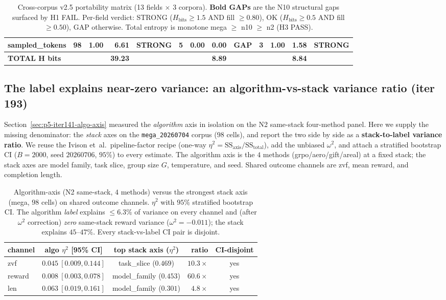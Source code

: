 \documentclass{article}  \usepackage[preprint,nonatbib]{neurips_2026} \usepackage[numbers]{natbib}
\begin{document}
\begin{table}[t]
\begin{tabular}{l r r r r r r r r r r r r}
sampled\_tokens       & 98 & 1.00 & 6.61 & STRONG & 5 & 0.00 & 0.00 & \textbf{GAP}    & 3 & 1.00 & 1.58 & STRONG \\
\midrule
\textbf{TOTAL H bits} & & & \textbf{39.23} & & & & \textbf{8.89} & & & & \textbf{8.84} & \\
\bottomrule
\end{tabular}
\caption{Cross-corpus v2.5 portability matrix (13 fields $\times$ 3 corpora).
\textbf{Bold GAPs} are the N10 structural gaps surfaced by H1 FAIL.
Per-field verdict: STRONG ($H_{\text{bits}} \geq 1.5$ AND fill $\geq 0.80$),
OK ($H_{\text{bits}} \geq 0.5$ AND fill $\geq 0.50$), GAP otherwise.
Total entropy is monotone mega $\geq$ n10 $\geq$ n2 (H3 PASS).}
\label{tab:p5-iter185-v25-cross-corpus}
\end{table} \subsection{The label explains near-zero variance: an algorithm-vs-stack
variance ratio (iter 193)}
\label{sec:p5-iter193-ratio}

Section~\ref{sec:p5-iter141-algo-axis} measured the \emph{algorithm} axis in
isolation on the N2 same-stack four-method panel. Here we supply the missing
denominator: the \emph{stack} axes on the \texttt{mega\_20260704} corpus
($98$ cells), and report the two side by side as a
\textbf{stack-to-label variance ratio}. We reuse the Ivison
et~al.\ pipeline-factor recipe (one-way $\eta^2 = \mathrm{SS}_{\text{axis}} /
\mathrm{SS}_{\text{total}}$), add the unbiased $\omega^2$, and attach a
stratified bootstrap CI ($B{=}2000$, seed $20260706$, $95\%$) to every estimate.
The algorithm axis is the $4$ methods (grpo/aero/gift/areal) at a fixed stack;
the stack axes are model family, task slice, group size $G$, temperature, and
seed. Shared outcome channels are zvf, mean reward, and completion length.

\begin{table}[t]
\centering\small
\caption{Algorithm-axis (N2 same-stack, $4$ methods) versus the strongest
stack axis (mega, $98$ cells) on shared outcome channels. $\eta^2$ with
$95\%$ stratified bootstrap CI. The algorithm \emph{label} explains
$\le 6.3\%$ of variance on every channel and (after $\omega^2$ correction)
\emph{zero} same-stack reward variance ($\omega^2 = -0.011$); the stack
explains $45$--$47\%$. Every stack-vs-label CI pair is disjoint.}
\label{tab:p5-iter193-ratio}
\begin{tabular}{lccrc}
\toprule
channel & algo $\eta^2$ [95\% CI] & top stack axis ($\eta^2$) & ratio & CI-disjoint \\
\midrule
zvf    & $0.045\ [0.009,0.144]$ & task\_slice ($0.469$)   & $10.3\times$ & yes \\
reward & $0.008\ [0.003,0.078]$ & model\_family ($0.453$) & $60.6\times$ & yes \\
len    & $0.063\ [0.019,0.161]$ & model\_family ($0.301$) & $4.8\times$  & yes \\
\bottomrule
\end{tabular}
\end{table}
\end{document}
